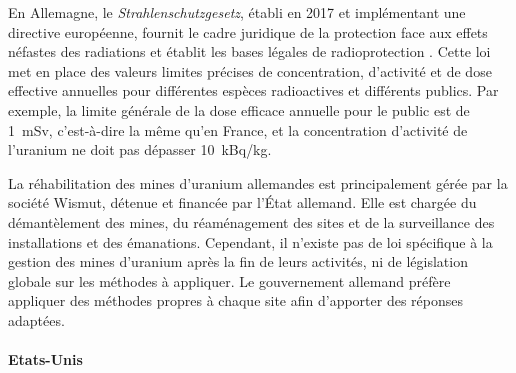 \documentclass{article}
\begin{document}
En Allemagne, le \emph{Strahlenschutzgesetz}, établi en 2017 et implémentant une directive européenne, fournit le cadre juridique de la protection face aux effets néfastes des radiations et établit les bases légales de radioprotection \cite{noauthor_nuclear_nodate}.
Cette loi met en place des valeurs limites précises de concentration, d’activité et de dose effective annuelles pour différentes espèces radioactives et différents publics. Par exemple, la limite générale de la dose efficace annuelle pour le public est de 1~mSv, c'est-à-dire la même qu'en France, et la concentration d’activité de l’uranium ne doit pas dépasser 10~kBq/kg.

La réhabilitation des mines d’uranium allemandes est principalement gérée par la société Wismut, détenue et financée par l'État allemand. Elle est chargée du démantèlement des mines, du réaménagement des sites et de la surveillance des installations et des émanations.
Cependant, il n’existe pas de loi spécifique à la gestion des mines d’uranium après la fin de leurs activités, ni de législation globale sur les méthodes à appliquer. Le gouvernement allemand préfère appliquer des méthodes propres à chaque site afin d’apporter des réponses adaptées.

\paragraph{Etats-Unis \\ \\}
\end{document}
